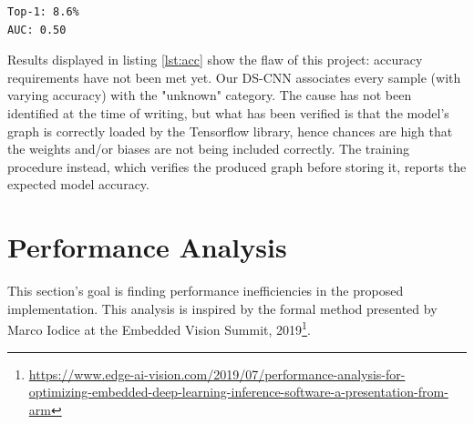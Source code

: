 \documentclass{article}
\begin{document}
\begin{lstlisting}[caption=Accuracy Benchmark Result]
Top-1: 8.6%
AUC: 0.50
\end{lstlisting}\label{lst:acc}
Results displayed in listing \ref{lst:acc} show the flaw of this project: accuracy requirements have not been met yet. Our DS-CNN associates every sample (with varying accuracy) with the "unknown" category. The cause has not been identified at the time of writing, but what has been verified is that the model's graph is correctly loaded by the Tensorflow library, hence chances are high that the weights and/or biases are not being included correctly. The training procedure instead, which verifies the produced graph before storing it, reports the expected model accuracy.

\section{Performance Analysis}\label{perf}
This section's goal is finding performance inefficiencies in the proposed implementation. This analysis is inspired by the formal method presented by Marco Iodice at the Embedded Vision Summit, 2019\footnote{\url{https://www.edge-ai-vision.com/2019/07/performance-analysis-for-optimizing-embedded-deep-learning-inference-software-a-presentation-from-arm}}.
\end{document}
